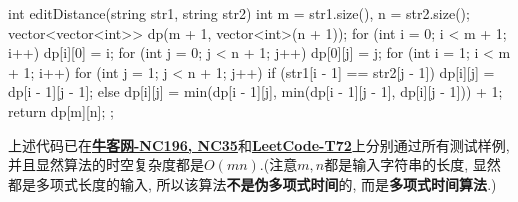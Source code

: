 \documentclass{article}
\begin{document}
\begin{homeworkProblem}
\begin{tcblisting}
{    int editDistance(string str1, string str2) {
        int m = str1.size(), n = str2.size();
        vector<vector<int>> dp(m + 1, vector<int>(n + 1));
        for (int i = 0; i < m + 1; i++) {
            dp[i][0] = i;
        }
        for (int j = 0; j < n + 1; j++) {
            dp[0][j] = j;
        }
        for (int i = 1; i < m + 1; i++) {
            for (int j = 1; j < n + 1; j++) {
                if (str1[i - 1] == str2[j - 1]) {
                    dp[i][j] = dp[i - 1][j - 1];
                } else {
                    dp[i][j] = min(dp[i - 1][j], min(dp[i - 1][j - 1], dp[i][j - 1])) + 1;
                }
            }
        }
        return dp[m][n];
    }
};
\end{tcblisting}
	上述代码已在\href{https://www.nowcoder.com/practice}{\textbf{牛客网-NC196, NC35}}和\href{https://leetcode.cn/problems/edit-distance/description/}{\textbf{LeetCode-T72}}上分别通过所有测试样例, 并且显然算法的时空复杂度都是$O(mn)$.(注意$m,n$都是输入字符串的长度, 显然都是多项式长度的输入, 所以该算法\textbf{不是伪多项式时间}的, 而是\textbf{多项式时间算法}.)
\end{homeworkProblem}


\pagebreak
\end{document}
